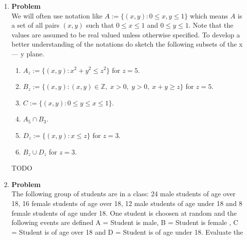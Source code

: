 \documentclass[12pt]{article}
\newenvironment{Ex}{\textbf{Problem}\vspace{.75em}\\}{}
\begin{document}
\begin{enumerate}
\begin{Ex}
\begin{solution}
\begin{enumerate}
      \item This assumes that the sum of both power subcells $a,b$
        fall within the range $(5,6)$. Reference \cref{fig:power-fig}
        for a graphical representation. The event is the shaded region
        between the two curves, calculated to be $3.5/25$, or $0.14$.
        \begin{figure}[Hb]
          \centering
          
          \caption{A graphical representation of the event requirements}
          \label{fig:power-fig}
        \end{figure}
      \end{enumerate}
    \end{solution}
  \end{Ex}
\item 
  \begin{Ex}
    We will often use notation like $A:=\{(x,y) : 0 \le x, y\le 1\}$
    which means $A$ is a set of all pairs $(x,y)$ such that $0\le x\le
    1$ and $0 \le y \le 1$. Note that the values are assumed to be
    real valued unless otherwise specified. To develop a better
    understanding of the notations do sketch the following subsets of
    the x --- y plane.
    \begin{enumerate}
    \item $A_z := \{(x,y) : x^2+y^2 \le z^2\}$ for $z=5$.
    \item $B_z := \{(x,y) : (x,y) \in \mathbb{Z},\; x>0,\; y>0,\; x+y\ge z\}$ for $z=5$.
    \item $C := \{(x,y) : 0 \le y \le x \le 1\}$.
    \item $A_5 \cap B_3$.
    \item $D_z :=\{(x,y) : x \le z\}$ for $z=3$.
    \item $B_z \cup D_z$ for $z=3$.
    \end{enumerate}
    \begin{solution} \hfill
      {\huge TODO}
    \end{solution}
  \end{Ex}
\item 
  \begin{Ex}
    The following group of students are in a class: 24 male students
    of age over 18, 16 female students of age over 18, 12 male
    students of age under 18 and 8 female students of age under
    18. One student is choosen at random and the following events are
    defined A = Student is male, B = Student is female , C = Student is
    of age over 18 and D = Student is of age under 18. Evaluate the

\end{Ex}
\end{enumerate}
\end{document}
